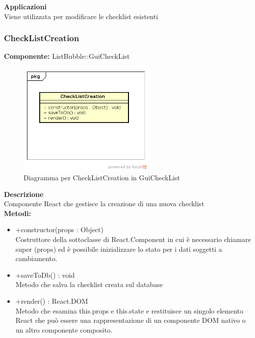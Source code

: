 \textbf{Applicazioni}\\
Viene utilizzata per modificare le checklist esistenti 


\clearpage

\subsubsection{CheckListCreation}
\textbf{Componente:}  ListBubble::GuiCheckList\\
   \FloatBarrier
   \begin{figure}[ht]
   \centering
   \includegraphics[width=0.6\textwidth]{img/single-CheckListCreation.png}
   \caption{{Diagramma per CheckListCreation in GuiCheckList}}
\end{figure}
\FloatBarrier
\textbf{Descrizione}\\
Componente React che gestisce la creazione di una nuova checklist \\
\textbf{Metodi:} 
\begin{itemize}

\item +constructor(props : Object)
\\
Costruttore della sottoclasse di React.Component in cui è necessario chiamare super (props) ed è possibile inizializzare lo stato per i dati soggetti a cambiamento.

\item +saveToDb() : void  
\\
Metodo che salva la checklist creata sul database

\item +render() : React.DOM 
\\
Metodo che esamina this.props e this.state e restituisce un singolo elemento React che può essere una rappresentazione di un componente DOM nativo o un altro componente composito.

\end{itemize}

